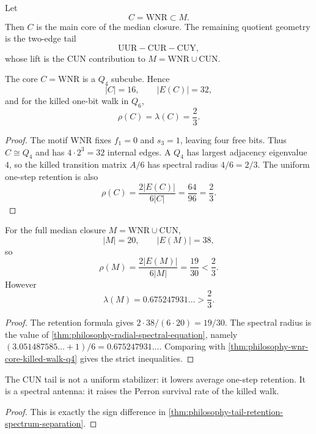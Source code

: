 \begin{definition}
\label{def:philosophy-core-and-cun-tail}
Let
$$
  C=\mathrm{WNR}\subset M.
$$
Then $C$ is the main core of the median closure. The remaining quotient
geometry is the two-edge tail
$$
  \mathrm{UUR}-\mathrm{CUR}-\mathrm{CUY},
$$
whose lift is the $\mathrm{CUN}$ contribution to $M=\mathrm{WNR}\cup
\mathrm{CUN}$.
\end{definition}

\begin{theorem}
\label{thm:philosophy-wnr-core-killed-walk-q4}
The core $C=\mathrm{WNR}$ is a $Q_{4}$ subcube. Hence
$$
  |C|=16,\qquad |E(C)|=32,
$$
and for the killed one-bit walk in $Q_{6}$,
$$
  \rho(C)=\lambda(C)=\frac{2}{3}.
$$
\end{theorem}
\begin{proof}
The motif $\mathrm{WNR}$ fixes $f_{1}=0$ and $s_{3}=1$, leaving four
free bits. Thus $C\cong Q_{4}$ and has $4\cdot 2^{3}=32$ internal
edges. A $Q_{4}$ has largest adjacency eigenvalue $4$, so the killed
transition matrix $A/6$ has spectral radius $4/6=2/3$. The uniform
one-step retention is also
$$
  \rho(C)=\frac{2|E(C)|}{6|C|}=\frac{64}{96}=\frac{2}{3}.
$$
\end{proof}

\begin{theorem}
\label{thm:philosophy-tail-retention-spectrum-separation}
For the full median closure $M=\mathrm{WNR}\cup\mathrm{CUN}$,
$$
  |M|=20,\qquad |E(M)|=38,
$$
so
$$
  \rho(M)=\frac{2|E(M)|}{6|M|}
  =
  \frac{19}{30}
  <
  \frac{2}{3}.
$$
However
$$
  \lambda(M)=0.675247931\ldots>\frac{2}{3}.
$$
\end{theorem}
\begin{proof}
The retention formula gives $2\cdot 38/(6\cdot 20)=19/30$. The spectral
radius is the value of
\autoref{thm:philosophy-radial-spectral-equation}, namely
$(3.051487585\ldots+1)/6=0.675247931\ldots$. Comparing with
\autoref{thm:philosophy-wnr-core-killed-walk-q4} gives the strict
inequalities.
\end{proof}

\begin{corollary}
\label{cor:philosophy-spectral-antenna-behavior}
The $\mathrm{CUN}$ tail is not a uniform stabilizer: it lowers average
one-step retention. It is a spectral antenna: it raises the Perron
survival rate of the killed walk.
\end{corollary}
\begin{proof}
This is exactly the sign difference in
\autoref{thm:philosophy-tail-retention-spectrum-separation}.
\end{proof}

